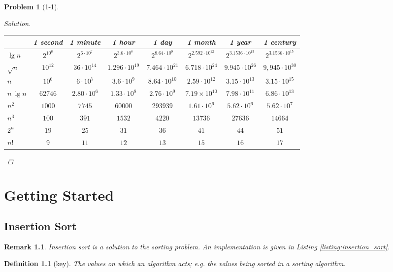 \documentclass[oneside]{book}
\newtheorem{problem}{Problem}[section]
\newtheorem{definition}{Definition}[chapter]
\newtheorem{rem}{Remark}[chapter]
\begin{document}
\begin{spacing}{1.618}
\begin{problem}[1-1]
\begin{proof}[Solution]
		\begin{tabular}{l|c|c|c|c|c|c|c|}
			 & 1 second & 1 minute & 1 hour & 1 day & 1 month & 1 year & 1 century \\
			 \hline
			 $\lg{n}$ & $2^{10^6}$ & $2^{6\cdot 10^7}$ & $ 2^{3.6 \cdot 10^8}$ & $2^{8.64 \cdot 10^9}$ & $2^{2.592\cdot 10^{12}}$ & $2^{3.1536\cdot 10^{13}}$ & $2^{3.1536 \cdot 10^{15}}$ \\
			 \hline
			 $\sqrt{n}$ & $10^{12}$ & $36 \cdot 10^{14}$ & $1.296 \cdot 10^{19}$ & $7.464\cdot 10^{21}$ & $6.718\cdot 10^{24}$ & $9.945\cdot 10^{26}$ & $9,945\cdot 10^{30}$ \\
			 \hline 
			 $n$ & $10^6$ & $6 \cdot 10^7$ & $3.6\cdot 10^9$ & $8.64\cdot 10^{10}$ & $2.59\cdot 10^{12}$ & $3.15\cdot 10^{13}$ & $3.15\cdot 10^{15}$ \\
			 \hline
			 $n~\lg{n}$ & $62746$ & $2.80\cdot 10^6$ & $1.33\cdot 10^8$ & $2.76\cdot 10^9$ & $7.19\times 10^{10}$ & $7.98\cdot 10^{11}$ & $6.86\cdot 10^{13}$ \\
			 \hline
			 $n^2$ & $1000$ & $7745$ & $60000$ & $293939$ & $1.61\cdot 10^6$ & $5.62\cdot 10^6$ & $5.62\cdot 10^7$ \\
			\hline
			 $n^3$ & $100$ & $391$ & $ 1532$ & $4220$ & $13736$ & $27636$ & $14664$\\
			\hline
			 $2^n$ & $19$ & $25$ & $31$ & $36$ & $41$ & $ 44$ & $ 51$ \\
			\hline
			 $n!$ & $9$ & $11$ & $12$ & $13$ & $15$ & $16$ & $17$\\
			\hline
		\end{tabular}
	\end{proof}
\end{problem}

\chapter{Getting Started}
\section{Insertion Sort}

\begin{rem}
	Insertion sort is a solution to the sorting problem. An implementation is given in Listing \ref{listing:insertion_sort}.
\end{rem}

\begin{definition}[key]
	The values on which an algorithm acts; e.g. the values being sorted in a sorting algorithm. 
\end{definition}


\end{spacing}
\end{document}
